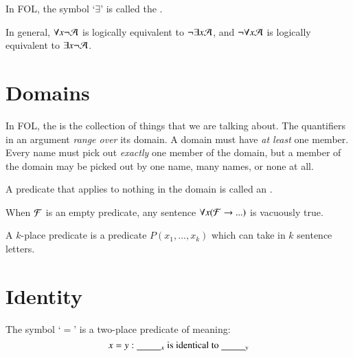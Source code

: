 \begin{definition}
    In FOL, the symbol `$\exists$' is called the .
\end{definition}

\begin{remark}
    In general, $\forall x\neg \mathcal{A}$ is logically equivalent to $\neg \exists x\mathcal{A}$, and $\neg\forall x \mathcal{A}$ is logically equivalent to $\exists x \neg \mathcal{A}$.
\end{remark}


\section{ Domains}

\begin{definition}
    In FOL, the  is the collection of things that we are talking about. The quantifiers in an argument \emph{range over} its domain. A domain must have \emph{at least} one member. Every name must pick out \emph{exactly} one member of the domain, but a member of the domain may be picked out by one name, many names, or none at all.
\end{definition}

\begin{definition}
    A predicate that applies to nothing in the domain is called an .
\end{definition}

\begin{remark}
    When $\mathcal{F}$ is an empty predicate, any sentence $\forall x(\mathcal{F}\rightarrow...)$ is vacuously true.
\end{remark}

\begin{definition}
    A $k$-place predicate is a predicate $P(x_1,...,x_k)$ which can take in $k$ sentence letters.
\end{definition}

\section{ Identity}

\begin{definition}
    The symbol `$=$' is a two-place predicate of meaning: \begin{equation*}
        x=y: \text{\underline{\hspace*{2.5em}}$_{x}$ is identical to \underline{\hspace*{2.5em}}$_{y}$}
    \end{equation*}
\end{definition}


